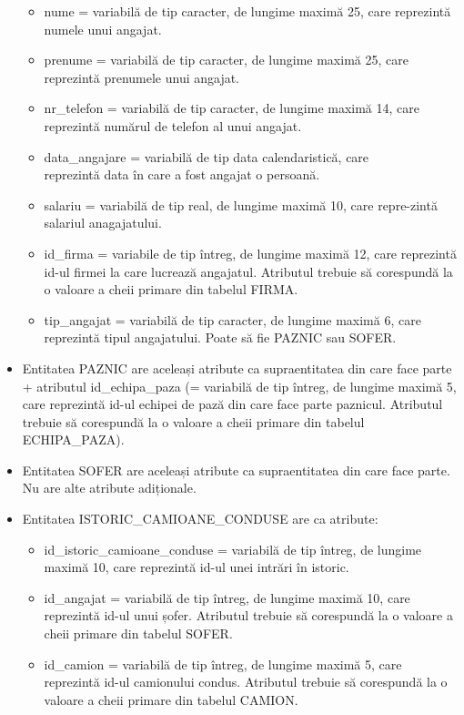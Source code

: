 \documentclass[12pt, a4paper]{article}
\begin{document}
\begin{itemize}
\begin{itemize}
            \item nume = variabilă de tip caracter, de lungime maximă 25, care reprezintă numele unui angajat.
            \item prenume = variabilă de tip caracter, de lungime maximă 25, care reprezintă prenumele unui angajat.
            \item nr\_telefon = variabilă de tip caracter, de lungime maximă 14, care reprezintă numărul de telefon al unui angajat.
            \item data\_angajare = variabilă de tip data calendaristică, care \\reprezintă data în care a fost angajat o persoană.
            \item salariu = variabilă de tip real, de lungime maximă 10, care repre-zintă salariul anagajatului.
            \item id\_firma = variabile de tip întreg, de lungime maximă 12, care reprezintă id-ul firmei la care lucrează angajatul. Atributul trebuie să corespundă la o valoare a cheii primare din tabelul FIRMA.
            \item tip\_angajat = variabilă de tip caracter, de lungime maximă 6, care reprezintă tipul angajatului. Poate să fie PAZNIC sau SOFER.
        \end{itemize}
    \item Entitatea PAZNIC are aceleași atribute ca supraentitatea din care face parte + atributul id\_echipa\_paza (= variabilă de tip întreg, de lungime maximă 5, care reprezintă id-ul echipei de pază din care face parte paznicul. Atributul trebuie să corespundă la o valoare a cheii primare din tabelul ECHIPA\_PAZA).
    \item Entitatea SOFER are aceleași atribute ca supraentitatea din care face parte. Nu are alte atribute adiționale.
    \item Entitatea ISTORIC\_CAMIOANE\_CONDUSE are ca atribute:
        \begin{itemize}
            \item id\_istoric\_camioane\_conduse = variabilă de tip întreg, de lungime maximă 10, care reprezintă id-ul unei intrări în istoric.
            \item id\_angajat = variabilă de tip întreg, de lungime maximă 10, care reprezintă id-ul unui șofer. Atributul trebuie să corespundă la o valoare a cheii primare din tabelul SOFER.
            \item id\_camion = variabilă de tip întreg, de lungime maximă 5, care reprezintă id-ul camionului condus. Atributul trebuie să corespundă la o valoare a cheii primare din tabelul CAMION.

\end{itemize}
\end{itemize}
\end{document}
